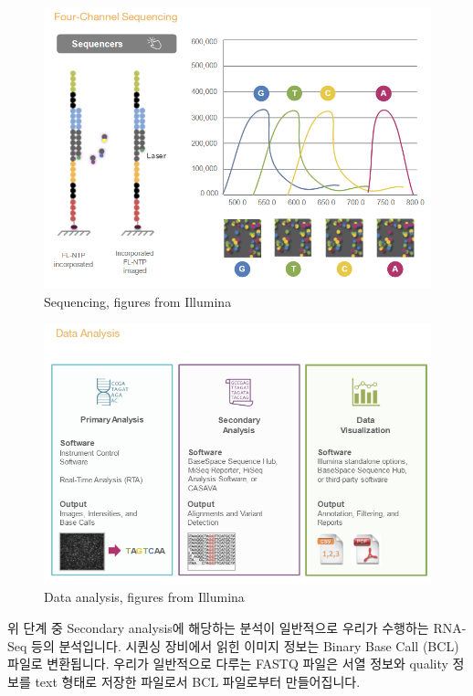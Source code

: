\documentclass[
]{book}
\begin{document}
\begin{figure}
\centering
\includegraphics[width=5.20833in,height=\textheight]{images/12/illuminaseq_seq2.png}
\caption{Sequencing, figures from Illumina}
\end{figure}

\begin{figure}
\centering
\includegraphics[width=5.20833in,height=\textheight]{images/12/illuminaseq_dataanalysis.png}
\caption{Data analysis, figures from Illumina}
\end{figure}

위 단계 중 Secondary analysis에 해당하는 분석이 일반적으로 우리가 수행하는 RNA-Seq 등의 분석입니다. 시퀀싱 장비에서 읽힌 이미지 정보는 Binary Base Call (BCL) 파일로 변환됩니다. 우리가 일반적으로 다루는 FASTQ 파일은 서열 정보와 quality 정보를 text 형태로 저장한 파일로서 BCL 파일로부터 만들어집니다.
\end{document}
